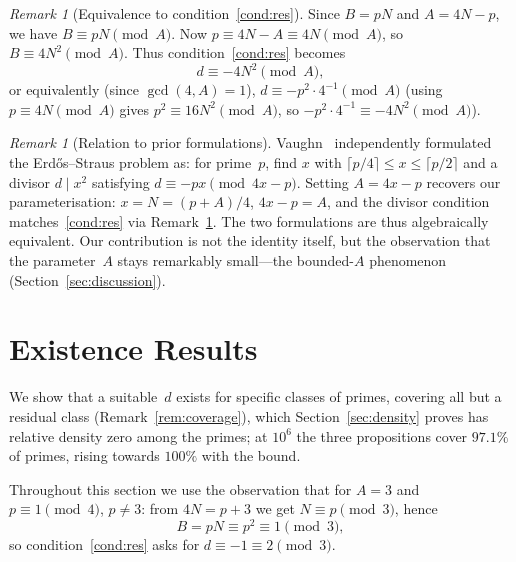 \documentclass[12pt]{amsart}
\theoremstyle{definition}
\theoremstyle{remark}
\newtheorem{remark}[theorem]{Remark}
\begin{document}
\begin{remark}[Equivalence to condition~\ref{cond:res}]\label{rem:residue}
Since $B = pN$ and $A = 4N - p$, we have $B \equiv pN \pmod{A}$.
Now $p \equiv 4N - A \equiv 4N \pmod{A}$, so $B \equiv 4N^2 \pmod{A}$.
Thus condition~\ref{cond:res} becomes
\[
  d \equiv -4N^2 \pmod{A},
\]
or equivalently (since $\gcd(4, A) = 1$),
$d \equiv -p^2 \cdot 4^{-1} \pmod{A}$
(using $p \equiv 4N \pmod{A}$ gives $p^2 \equiv 16N^2 \pmod A$,
so $-p^2 \cdot 4^{-1} \equiv -4N^2 \pmod A$).
\end{remark}

\begin{remark}[Relation to prior formulations]\label{rem:prior}
Vaughn~\cite{Vaughn2024} independently formulated the Erd\H{o}s--Straus
problem as: for prime~$p$, find $x$ with $\lceil p/4\rceil \leq x \leq
\lceil p/2 \rceil$ and a divisor $d \mid x^2$ satisfying
$d \equiv -px \pmod{4x - p}$.
Setting $A = 4x - p$ recovers our parameterisation: $x = N = (p+A)/4$,
$4x - p = A$, and the divisor condition matches~\ref{cond:res} via
Remark~\ref{rem:residue}. The two formulations are thus algebraically equivalent.
Our contribution is not the identity itself, but the observation that
the parameter~$A$ stays remarkably small---the bounded-$A$ phenomenon
(Section~\ref{sec:discussion}).
\end{remark}


\section{Existence Results}\label{sec:existence}

We show that a suitable~$d$ exists for specific classes of primes,
covering all but a residual class (Remark~\ref{rem:coverage}), which
Section~\ref{sec:density} proves has relative density zero among the
primes; at $10^6$ the three propositions cover
$97.1\%$ of primes, rising towards $100\%$ with the bound.

Throughout this section we use the observation that for $A = 3$ and
$p \equiv 1 \pmod 4$, $p \neq 3$: from $4N = p + 3$ we get
$N \equiv p \pmod 3$, hence
\begin{equation}\label{eq:Bmod3}
  B = pN \equiv p^2 \equiv 1 \pmod 3 ,
\end{equation}
so condition~\ref{cond:res} asks for $d \equiv -1 \equiv 2 \pmod 3$.
\end{document}
